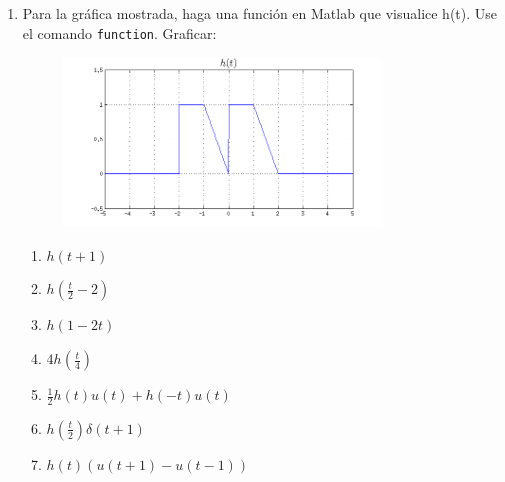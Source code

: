 \documentclass[a4paper,11pt,final]{article}
\begin{document}
\begin{enumerate}
        \item Para la gráfica mostrada, haga una función en Matlab que
        visualice h(t). Use el comando \texttt{function}. Graficar:

        \begin{figure}[H]
            \begin{center}
                \includegraphics[width=0.80\textwidth]{./lab2prob7.png}
            \end{center}
        \end{figure}

        \begin{enumerate}
            \item $h\left(t+1\right)$
            \item $h\left(\frac{t}{2}-2\right)$
            \item $h\left(1-2t\right)$
            \item $4h\left(\frac{t}{4}\right)$
            \item $\frac{1}{2}h\left(t\right)u\left(t\right) + h\left(-t\right)u\left(t\right)$
            \item $h\left(\frac{t}{2}\right)\delta\left(t+1\right)$
            \item $h\left(t\right)\left(u\left(t+1\right)-u\left(t-1\right)\right)$
        \end{enumerate}
    \end{enumerate}
\end{document}
